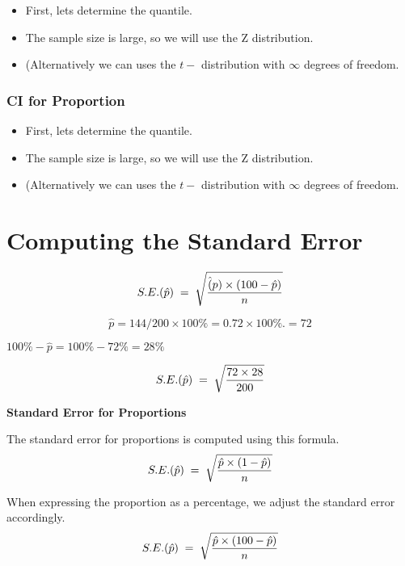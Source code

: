 \documentclass[]{report}
\begin{document}
\begin{itemize}
\item First, lets determine the quantile.
\item The sample size is large, so we will use the Z distribution.
\item (Alternatively we can uses the $t-$ distribution with $\infty$ degrees of freedom.
\end{itemize}


\subsubsection{CI for Proportion}

\begin{itemize}
\item First, lets determine the quantile.
\item The sample size is large, so we will use the Z distribution.
\item (Alternatively we can uses the $t-$ distribution with $\infty$ degrees of freedom.
\end{itemize}





\section{Computing the Standard Error}

\[
S.E. (\hat{p}) \;=\; \sqrt{ {\hat(p) \times (100 -\hat{p} )\over n}}
\]




\[
\hat{p} = {144/200}  \times 100\%  = 0.72 \times 100\%.  = 72%
\]

$100\% - \hat{p} = 100\% - 72\% = 28\% $




\[
S.E. (\hat{p}) \;=\; \sqrt{ {72 \times 28 \over 200 }}
\]

\newpage


{

\textbf{ Standard Error for Proportions}

The standard error for proportions is computed using this formula.
\[
S.E. (\hat{p}) \;=\; \sqrt{ {\hat{p} \times (1-\hat{p} )\over n}}
\]

\smallskip
When expressing the proportion as a percentage, we adjust the standard error accordingly.
\[
S.E. (\hat{p}) \;=\; \sqrt{ {\hat{p} \times (100 -\hat{p} )\over n}}
\]
}
\end{document}
